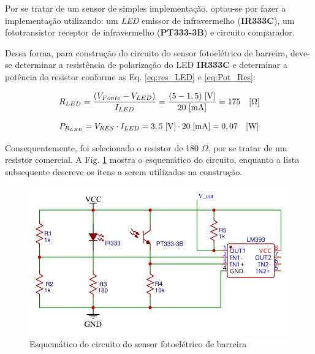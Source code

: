    Por se tratar de um sensor de simples implementação, optou-se por fazer a implementação utilizando: um \textit{LED} emissor de infravermelho (\textbf{IR333C}), um fototransistor receptor de infravermelho (\textbf{PT333-3B}) e circuito comparador.
    
    Dessa forma, para construção do circuito do sensor fotoelétrico de barreira, deve-se determinar a resistência de polarização do LED \textbf{IR333C} e determinar a potência do resistor conforme as Eq. \ref{eq:res_LED} e \ref{eq:Pot_Res}:
    
    \begin{equation}
        R_{LED} = \frac{(V_{Fonte} - V_{LED})}{I_{LED}} = \frac{( 5 - 1,5) \hspace{0.1cm} [\text{V}]}{20 \hspace{0.1cm} [\text{mA}]} = 175 \quad [\Omega]
        \label{eq:res_LED}
    \end{equation}
    
        \begin{equation}
        P_{R_{LED}} = V_{RES} \cdot I_{LED} = 3,5 \hspace{0.1cm}
        [\text{V}] \cdot 20 \hspace{0.1cm} [\text{mA}] = 0,07 \quad [\text{W}] 
        \label{eq:Pot_Res}
    \end{equation}
    
    Consequentemente, foi selecionado o resistor de 180 $\Omega$, por se tratar de um resistor comercial. A Fig. \ref{fig:esq_sensor_barreira} mostra o esquemático do circuito, enquanto a lista subsequente descreve os itens a serem utilizados na construção.
    
    \begin{figure}[H]
    \centering
    \includegraphics[scale=0.6]{figuras/eletronica/esquematicos/sensor_barreira/Schematic_Sensor_barreira.pdf}
    \caption{Esquemático do circuito do sensor fotoelétrico de barreira}
    \label{fig:esq_sensor_barreira}
    \end{figure}
    

